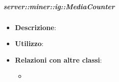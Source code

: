 		
	\subparagraph{server::miner::ig::MediaCounter} %
		\label{subp:server_miner_tw_MediaCounter}
			\begin{itemize}
				\item \textbf{Descrizione}:
				\item \textbf{Utilizzo}: 
				\item \textbf{Relazioni con altre classi}:
					\begin{itemize}
						\item 
					\end{itemize}
			\end{itemize}

		

